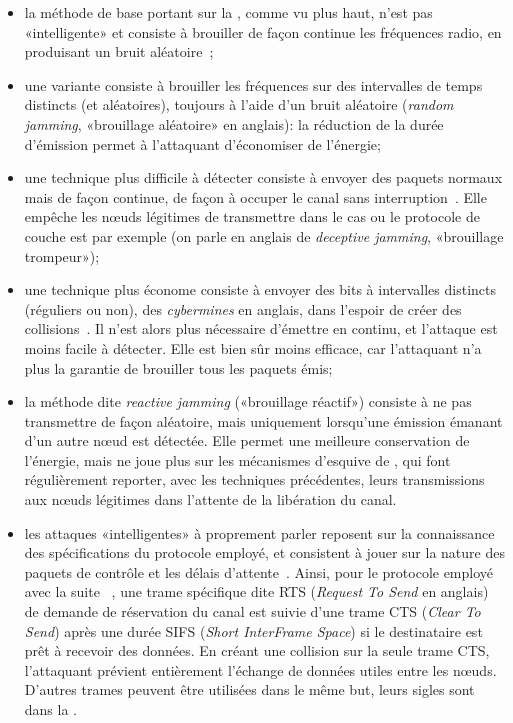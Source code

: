 \begin{itemize}
    \item la méthode de base portant sur la , comme vu plus haut, n'est pas «intelligente» et consiste à brouiller de façon continue les fréquences radio, en produisant un bruit aléatoire~\cite{PI11};
    \item une variante consiste à brouiller les fréquences sur des intervalles de temps distincts (et aléatoires), toujours à l'aide d'un bruit aléatoire (\textit{random jamming}, «brouillage aléatoire» en anglais): la réduction de la durée d'émission permet à l'attaquant d'économiser de l'énergie;
    \item une technique plus difficile à détecter consiste à envoyer des paquets normaux mais de façon continue, de façon à occuper le canal sans interruption~\cite{PI11}. Elle empêche les nœuds légitimes de transmettre dans le cas ou le protocole de couche \mac{} est \csmaca par exemple (on parle en anglais de \textit{deceptive jamming}, «brouillage trompeur»);
    \item une technique plus économe consiste à envoyer des bits à intervalles distincts (réguliers ou non), des \textit{cybermines} en anglais, dans l'espoir de créer des collisions~\cite{PI11}. Il n'est alors plus nécessaire d'émettre en continu, et l'attaque est moins facile à détecter. Elle est bien sûr moins efficace, car l'attaquant n'a plus la garantie de brouiller tous les paquets émis;
    \item la méthode dite \textit{reactive jamming} («brouillage réactif») consiste à ne pas transmettre de façon aléatoire, mais uniquement lorsqu'une émission émanant d'un autre nœud est détectée\cite{PI11}. Elle permet une meilleure conservation de l'énergie, mais ne joue plus sur les mécanismes d'esquive de , qui font régulièrement reporter, avec les techniques précédentes, leurs transmissions aux nœuds légitimes dans l'attente de la libération du canal.
    \item les attaques «intelligentes» à proprement parler reposent sur la connaissance des spécifications du protocole \mac employé, et consistent à jouer sur la nature des paquets de contrôle et les délais d'attente~\cite{PI11}. Ainsi, pour le protocole \csmaca employé avec la suite \ieeee~\cite{ieee802.11}, une trame spécifique dite RTS (\textit{Request To Send} en anglais) de demande de réservation du canal est suivie d'une trame CTS (\textit{Clear To Send}) après une durée SIFS (\textit{Short InterFrame Space}) si le destinataire est prêt à recevoir des données. En créant une collision sur la seule trame CTS, l'attaquant prévient entièrement l'échange de données utiles entre les nœuds. D'autres trames peuvent être utilisées dans le même but, leurs sigles sont dans la .
\end{itemize}
